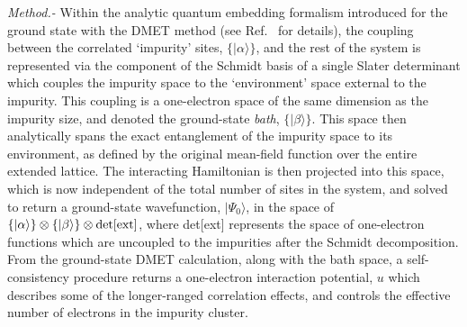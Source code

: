 \documentclass[aps,showpacs,twocolumn,nobibnotes]{revtex4}
\begin{document}
\emph{Method.-} Within the analytic quantum embedding formalism introduced for the ground state with the DMET method (see Ref.~ for details), the coupling between the 
correlated `impurity' sites, $\{ |\alpha \rangle \}$, and the rest of the system is represented via the component of the Schmidt basis of a single Slater determinant 
which couples the impurity space to the `environment' space external to the impurity. This coupling is a one-electron space of the same dimension as the impurity size, and denoted the 
ground-state {\em bath}, $\{ |\beta \rangle \}$. This space then analytically spans the exact entanglement of the impurity space to its environment, as defined by the original mean-field function
over the entire extended lattice. The interacting Hamiltonian is then projected into this space, which is now independent of the total number of sites in the system, and solved to return a 
ground-state wavefunction, $|\Psi_0 \rangle$,
in the space of $\{ |\alpha \rangle \} \otimes \{ |\beta \rangle \} \otimes \rm{det[ext]}$, where det[ext] represents the space of one-electron functions which are uncoupled to the impurities
after the Schmidt decomposition. From the ground-state DMET calculation, along with the bath space, a self-consistency procedure returns a one-electron interaction potential, $u$ which
describes some of the longer-ranged correlation effects, and controls the effective number of electrons in the impurity cluster.
\end{document}
